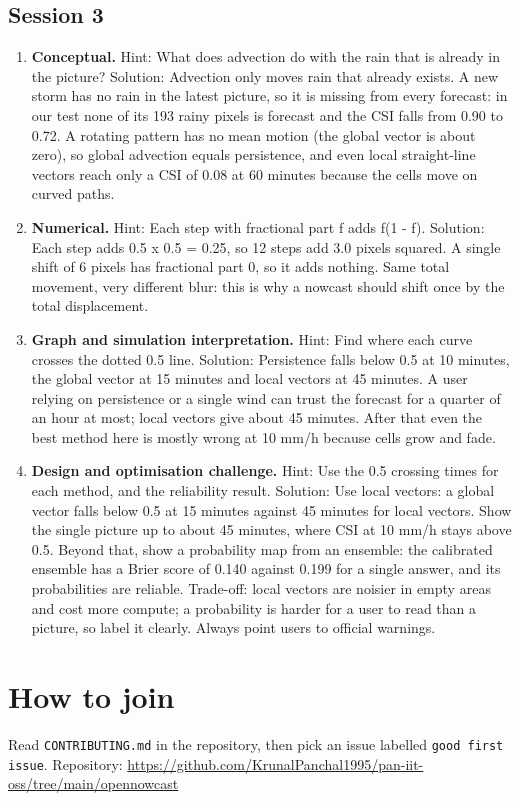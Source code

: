\documentclass[11pt,a4paper]{article}
\begin{document}
\subsection*{Session 3}
\begin{enumerate}[nosep]
\item \textbf{Conceptual.} Hint: What does advection do with the rain that is already in the picture? Solution: Advection only moves rain that already exists. A new storm has no rain in the latest picture, so it is missing from every forecast: in our test none of its 193 rainy pixels is forecast and the CSI falls from 0.90 to 0.72. A rotating pattern has no mean motion (the global vector is about zero), so global advection equals persistence, and even local straight-line vectors reach only a CSI of 0.08 at 60 minutes because the cells move on curved paths.
\item \textbf{Numerical.} Hint: Each step with fractional part f adds f(1 - f). Solution: Each step adds 0.5 x 0.5 = 0.25, so 12 steps add 3.0 pixels squared. A single shift of 6 pixels has fractional part 0, so it adds nothing. Same total movement, very different blur: this is why a nowcast should shift once by the total displacement.
\item \textbf{Graph and simulation interpretation.} Hint: Find where each curve crosses the dotted 0.5 line. Solution: Persistence falls below 0.5 at 10 minutes, the global vector at 15 minutes and local vectors at 45 minutes. A user relying on persistence or a single wind can trust the forecast for a quarter of an hour at most; local vectors give about 45 minutes. After that even the best method here is mostly wrong at 10 mm/h because cells grow and fade.
\item \textbf{Design and optimisation challenge.} Hint: Use the 0.5 crossing times for each method, and the reliability result. Solution: Use local vectors: a global vector falls below 0.5 at 15 minutes against 45 minutes for local vectors. Show the single picture up to about 45 minutes, where CSI at 10 mm/h stays above 0.5. Beyond that, show a probability map from an ensemble: the calibrated ensemble has a Brier score of 0.140 against 0.199 for a single answer, and its probabilities are reliable. Trade-off: local vectors are noisier in empty areas and cost more compute; a probability is harder for a user to read than a picture, so label it clearly. Always point users to official warnings.
\end{enumerate}

\section{How to join}
Read \texttt{CONTRIBUTING.md} in the repository, then pick an issue labelled \texttt{good first issue}. Repository: \url{https://github.com/KrunalPanchal1995/pan-iit-oss/tree/main/opennowcast}
\end{document}
